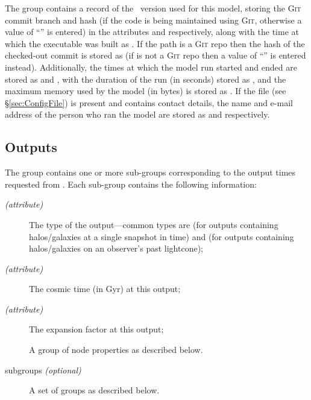 The  group contains a record of the \glc\ version used for this model, storing the {\normalfont \scshape Git} commit branch and hash (if the code is being maintained using {\normalfont \scshape Git}, otherwise a value of ``'' is entered) in the attributes  and  respectively, along with the time at which the executable was built as . If the  path is a {\normalfont \scshape Git} repo then the hash of the checked-out commit is stored as  (if  is not a {\normalfont \scshape Git} repo then a value of ``'' is entered instead). Additionally, the times at which the model run started and ended are stored as  and , with the duration of the run (in seconds) stored as , and the maximum memory used by the model (in bytes) is stored as . If the  file (see \S\ref{sec:ConfigFile}) is present and contains contact details, the name and e-mail address of the person who ran the model are stored as  and  respectively.

\subsection{Outputs}

The  group contains one or more sub-groups corresponding to the output times requested from \glc. Each sub-group contains the following information:
\begin{description}
 \item[ \emph{(attribute)}] The type of the output---common types are  (for outputs containing halos/galaxies at a single snapshot in time) and  (for outputs containing halos/galaxies on an observer's past lightcone);
 \item[ \emph{(attribute)}] The cosmic time (in Gyr) at this output;
 \item[ \emph{(attribute)}] The expansion factor at this output;
 \item[] A group of node properties as described below.
 \item[ subgroups \emph{(optional)}] A set of  groups as described below.
\end{description}

